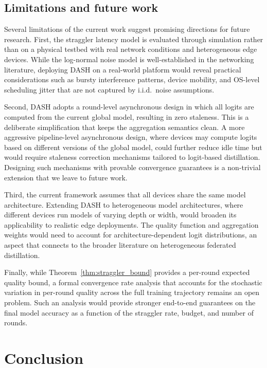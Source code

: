 \documentclass[a4paper,fleqn]{cas-dc}
\begin{document}
	\subsection{Limitations and future work}\label{sec:limitations}
	
	Several limitations of the current work suggest promising directions
	for future research.  First, the straggler latency model is
	evaluated through simulation rather than on a physical testbed with
	real network conditions and heterogeneous edge devices.  While the
	log-normal noise model is well-established in the networking
	literature, deploying DASH on a real-world platform would reveal
	practical considerations such as bursty interference patterns,
	device mobility, and OS-level scheduling jitter that are not captured
	by i.i.d.\ noise assumptions.
	
	Second, DASH adopts a round-level asynchronous design in which all
	logits are computed from the current global model, resulting in zero
	staleness.  This is a deliberate simplification that keeps the
	aggregation semantics clean.  A more aggressive pipeline-level
	asynchronous design, where devices may compute logits based on
	different versions of the global model, could further reduce idle
	time but would require staleness correction mechanisms tailored to
	logit-based distillation.  Designing such mechanisms with provable
	convergence guarantees is a non-trivial extension that we leave to
	future work.
	
	Third, the current framework assumes that all devices share the
	same model architecture.  Extending DASH to heterogeneous model
	architectures, where different devices run models of varying depth
	or width, would broaden its applicability to realistic edge
	deployments.  The quality function and aggregation weights would
	need to account for architecture-dependent logit distributions, an
	aspect that connects to the broader literature on heterogeneous
	federated distillation.
	
	Finally, while Theorem~\ref{thm:straggler_bound} provides a
	per-round expected quality bound, a formal convergence rate analysis
	that accounts for the stochastic variation in per-round quality
	across the full training trajectory remains an open problem.  Such
	an analysis would provide stronger end-to-end guarantees on the
	final model accuracy as a function of the straggler rate, budget,
	and number of rounds.
	
	
	\section{Conclusion}\label{sec:conclude}
	
\end{document}
